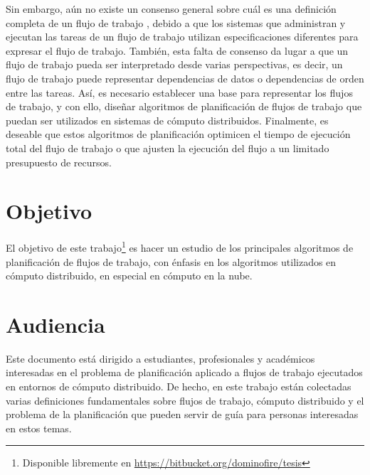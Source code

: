 Sin embargo, aún no existe un consenso general sobre cuál es una definición completa de un flujo de trabajo \cite{van2003workflow}, debido a que los sistemas que administran y ejecutan las tareas de un flujo de trabajo utilizan especificaciones diferentes para expresar el flujo de trabajo. También, esta falta de consenso da lugar a que un flujo de trabajo pueda ser interpretado desde varias perspectivas, es decir, un flujo de trabajo puede representar dependencias de datos o dependencias de orden entre las tareas. Así, es necesario establecer una base para representar los flujos de trabajo, y con ello, diseñar algoritmos de planificación de flujos de trabajo que puedan ser utilizados en sistemas de cómputo distribuidos. Finalmente, es deseable que estos algoritmos de planificación optimicen el tiempo de ejecución total del flujo de trabajo o que ajusten la ejecución del flujo a un limitado presupuesto de recursos.



\section{Objetivo}
El objetivo de este trabajo\footnote{Disponible libremente en \url{https://bitbucket.org/dominofire/tesis}} es hacer un estudio de los principales algoritmos de planificación de flujos de trabajo, con énfasis en los algoritmos utilizados en cómputo distribuido, en especial en cómputo en la nube.

\section{Audiencia}
Este documento está dirigido a estudiantes, profesionales y académicos interesadas en el problema de planificación aplicado a flujos de trabajo ejecutados en entornos de cómputo distribuido. De hecho, en este trabajo están colectadas varias definiciones fundamentales sobre flujos de trabajo, cómputo distribuido y el problema de la planificación que pueden servir de guía para personas interesadas en estos temas.


